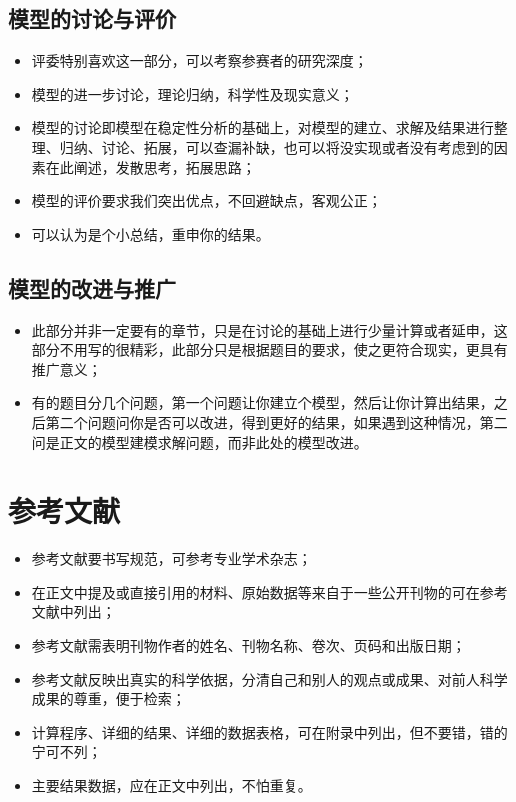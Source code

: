 \documentclass[openany]{progbookcn}
\begin{document}
\subsection{模型的讨论与评价}
\begin{itemize}
    \item 评委特别喜欢这一部分，可以考察参赛者的研究深度；
    \item 模型的进一步讨论，理论归纳，科学性及现实意义；
    \item 模型的讨论即模型在稳定性分析的基础上，对模型的建立、求解及结果进行整理、归纳、讨论、拓展，可以查漏补缺，也可以将没实现或者没有考虑到的因素在此阐述，发散思考，拓展思路；
    \item 模型的评价要求我们突出优点，不回避缺点，客观公正；
    \item 可以认为是个小总结，重申你的结果。
\end{itemize}
\subsection{模型的改进与推广}
\begin{itemize}
    \item 此部分并非一定要有的章节，只是在讨论的基础上进行少量计算或者延申，这部分不用写的很精彩，此部分只是根据题目的要求，使之更符合现实，更具有推广意义；
    \item 有的题目分几个问题，第一个问题让你建立个模型，然后让你计算出结果，之后第二个问题问你是否可以改进，得到更好的结果，如果遇到这种情况，第二问是正文的模型建模求解问题，而非此处的模型改进。
\end{itemize}
\section{参考文献}
\begin{itemize}
    \item 参考文献要书写规范，可参考专业学术杂志；
    \item 在正文中提及或直接引用的材料、原始数据等来自于一些公开刊物的可在参考文献中列出；
    \item 参考文献需表明刊物作者的姓名、刊物名称、卷次、页码和出版日期；
    \item 参考文献反映出真实的科学依据，分清自己和别人的观点或成果、对前人科学成果的尊重，便于检索；
    \item 计算程序、详细的结果、详细的数据表格，可在附录中列出，但不要错，错的宁可不列；
    \item 主要结果数据，应在正文中列出，不怕重复。
\end{itemize}
\appendix
\cleardoublepage
\end{document}
